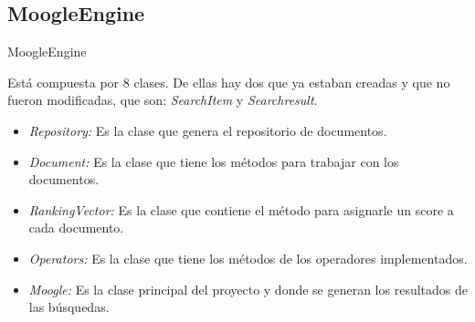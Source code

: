 \subsection{MoogleEngine}
\begin{frame}[fragile]{MoogleEngine}

  Está compuesta por 8 clases. De ellas hay dos que ya estaban creadas y que no 
  fueron modificadas, que son: \textit{SearchItem} y \textit{Searchresult}.

\pause

\begin{itemize}
\item \textit{Repository:} Es la clase que genera el repositorio de documentos. 
\pause
\item \textit{Document:} Es la clase que tiene los métodos para trabajar con los documentos.
\pause
\item \textit{RankingVector:} Es la clase que contiene el método para asignarle un score a 
cada documento. 
\pause
\item \textit{Operators:} Es la clase que tiene los métodos de los operadores implementados.
\pause 
\item \textit{Moogle:} Es la clase principal del proyecto y donde se generan los resultados de 
las búsquedas. 

\end{itemize}

\end{frame}


